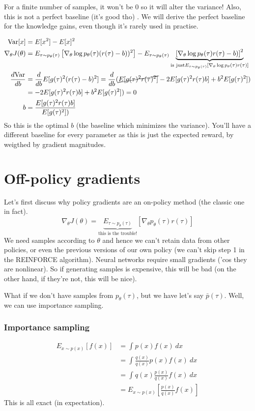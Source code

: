 \documentclass{report}
\begin{document}
For a finite number of samples, it won't be 0 so it will alter the variance!
Also, this is not a perfect baseline (it's good tho) . 
We will derive the perfect baseline for the knowledge gains, even though it's rarely used in practise.

\begin{align}
		\text{Var} [x] &= E[x^2] - E[x]^2 \\
		\nabla_\theta J(\theta) &= E_{\tau \sim p_\theta(\tau)} 
		\left [ \nabla_\theta \log p_\theta(\tau) (r(\tau) - b))^2 \right ]
		- E_{\tau \sim p_\theta(\tau)} 
		\underbrace{\left [ \nabla_\theta \log p_\theta(\tau) r(\tau) - b) \right ]^2}_
		{\text{is just} E_{\tau \sim p_\theta(\tau)} \left [ \nabla_\theta \log p_\theta(\tau) r(\tau) \right ]}  \\
		\frac{d \text{Var}}{db} &= \frac{d}{db} E[g(\tau)^2(r(\tau) - b)^2]
		= \frac{d}{db} (\cancel{E[g(\tau)^2r(\tau)^2]} - 2E[g(\tau)^2r(\tau)b ] + b^2 E[g(\tau)^2]) \\
								&= -2E[g(\tau)^2r(\tau)b ] + b^2 E[g(\tau)^2]) = 0\\
b &= \frac{E[g(\tau)^2r(\tau)b ]}{E[g(\tau)^2])} 
\end{align}
So this is the optimal $b$ (the baseline which minimizes the variance).
You'll have a different baseline for every parameter as
this is just the expected reward, by weigthed by gradient magnitudes.

\section{Off-policy gradients}
Let's first discuss why policy gradients are an on-policy method (the classic one in fact).
\begin{equation}
		\nabla_\theta J(\theta) = \underbrace{E_{\tau \sim p_\theta(\tau)}}_{\text{this is the trouble!}} [\nabla_\theta p_\theta(\tau)r(\tau)]
\end{equation}
We need samples according to $\theta$ and hence we can't retain data from other policies, or even 
the previous versions of our own policy (we can't skip step 1 in the REINFORCE algorithm).
Neural networks require small gradients ('cos they are nonlinear).
So if generating samples is expensive, this will be bad (on the other hand,
if they're not, this will be nice).

What if we don't have samples from $p_\theta(\tau)$, but we have let's say
$\bar{p}(\tau)$.
Well, we can use importance sampling.
\subsubsection{Importance sampling}
\begin{align}
		E_{x \sim p(x)} [f(x)]  
		&= \int_{{}}^{{}} {p(x)f(x)} \: d{x} \\
		&= \int_{{}}^{{}} {\frac{q(x)}{q(x)}  p(x)f(x)} \: d{x} \\
		&= \int_{{}}^{{}} { q(x) \frac{p(x)}{q(x)}  f(x)} \: d{x} \\
		&= E_{x \sim p(x)} \left [ \frac{p(x)}{q(x)} f(x) \right ]
\end{align}
This is all exact (in expectation).
\end{document}
